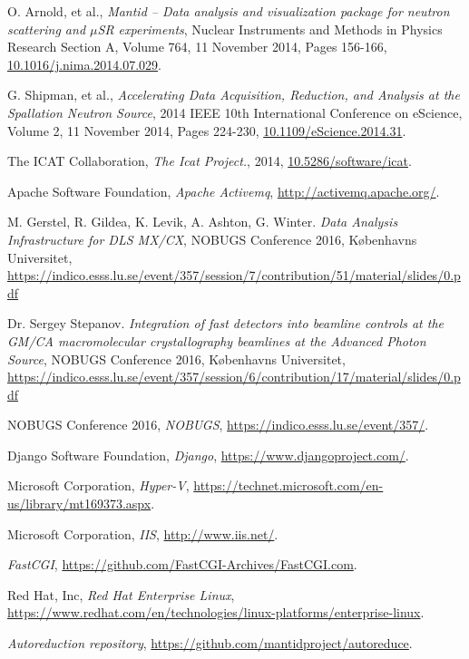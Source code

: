 \documentclass[twocolumn]{article}
\begin{document}
\begin{thebibliography}{99}
    O. Arnold, et al.,
    \emph{Mantid -- Data analysis and visualization package for neutron scattering and $\mu$SR experiments},
    Nuclear Instruments and Methods in Physics Research Section A, Volume 764, 11 November 2014, Pages 156-166,
    \href{http://dx.doi.org/10.1016/j.nima.2014.07.029}{10.1016/j.nima.2014.07.029}.

    G. Shipman, et al.,
    \emph{Accelerating Data Acquisition, Reduction, and Analysis at the Spallation Neutron Source},
    2014 IEEE 10th International Conference on eScience, Volume 2, 11 November 2014, Pages 224-230,
    \href{http://dx.doi.org/10.1109/eScience.2014.31}{10.1109/eScience.2014.31}.
    
    The ICAT Collaboration,
    \emph{The Icat Project.},
    2014,
    \href{https://doi.org/10.5286/SOFTWARE/ICAT}{10.5286/software/icat}.
    
    Apache Software Foundation,
    \emph{Apache Activemq},
    \url{http://activemq.apache.org/}.

	M. Gerstel, R. Gildea, K. Levik, A. Ashton, G. Winter.
	\emph{Data Analysis Infrastructure for DLS MX/CX},
	NOBUGS Conference 2016, Københavns Universitet,
	\url{https://indico.esss.lu.se/event/357/session/7/contribution/51/material/slides/0.pdf}

	Dr. Sergey Stepanov.
	\emph{Integration of fast detectors into beamline controls at the GM/CA macromolecular crystallography beamlines at the Advanced Photon Source},
	NOBUGS Conference 2016, Københavns Universitet,
	\url{https://indico.esss.lu.se/event/357/session/6/contribution/17/material/slides/0.pdf}

	NOBUGS Conference 2016,
	\emph{NOBUGS},
	\url{https://indico.esss.lu.se/event/357/}.
    
    Django Software Foundation,
    \emph{Django},
    \url{https://www.djangoproject.com/}.
    
    Microsoft Corporation,
    \emph{Hyper-V},
    \url{https://technet.microsoft.com/en-us/library/mt169373.aspx}.
    
    Microsoft Corporation,
    \emph{IIS},
    \url{http://www.iis.net/}.
    
    \emph{FastCGI},
    \url{https://github.com/FastCGI-Archives/FastCGI.com}.
    
    Red Hat, Inc,
    \emph{Red Hat Enterprise Linux},
    \url{https://www.redhat.com/en/technologies/linux-platforms/enterprise-linux}.
    
    \emph{Autoreduction repository},
    \url{https://github.com/mantidproject/autoreduce}.

    
\end{thebibliography}
\end{document}
